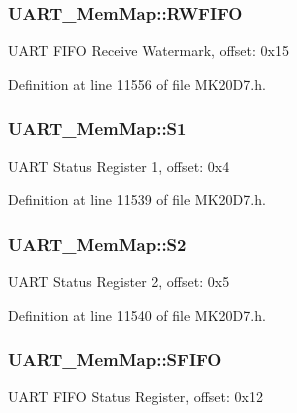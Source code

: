\subsubsection[{\texorpdfstring{R\+W\+F\+I\+FO}{RWFIFO}}]{ U\+A\+R\+T\+\_\+\+Mem\+Map\+::\+R\+W\+F\+I\+FO}\hypertarget{struct_u_a_r_t___mem_map_a3086e55b624e5192d20cec4736ee974c}{}\label{struct_u_a_r_t___mem_map_a3086e55b624e5192d20cec4736ee974c}
U\+A\+RT F\+I\+FO Receive Watermark, offset\+: 0x15 

Definition at line 11556 of file M\+K20\+D7.\+h.

\subsubsection[{\texorpdfstring{S1}{S1}}]{ U\+A\+R\+T\+\_\+\+Mem\+Map\+::\+S1}\hypertarget{struct_u_a_r_t___mem_map_a7eb8df4e43194dbd9f1d9bd4ab742cca}{}\label{struct_u_a_r_t___mem_map_a7eb8df4e43194dbd9f1d9bd4ab742cca}
U\+A\+RT Status Register 1, offset\+: 0x4 

Definition at line 11539 of file M\+K20\+D7.\+h.

\subsubsection[{\texorpdfstring{S2}{S2}}]{ U\+A\+R\+T\+\_\+\+Mem\+Map\+::\+S2}\hypertarget{struct_u_a_r_t___mem_map_a6107c55f4dba727e1a4e70f76acd7b20}{}\label{struct_u_a_r_t___mem_map_a6107c55f4dba727e1a4e70f76acd7b20}
U\+A\+RT Status Register 2, offset\+: 0x5 

Definition at line 11540 of file M\+K20\+D7.\+h.

\subsubsection[{\texorpdfstring{S\+F\+I\+FO}{SFIFO}}]{ U\+A\+R\+T\+\_\+\+Mem\+Map\+::\+S\+F\+I\+FO}\hypertarget{struct_u_a_r_t___mem_map_a5c2f7031c23749513028d0f35f833756}{}\label{struct_u_a_r_t___mem_map_a5c2f7031c23749513028d0f35f833756}
U\+A\+RT F\+I\+FO Status Register, offset\+: 0x12 

